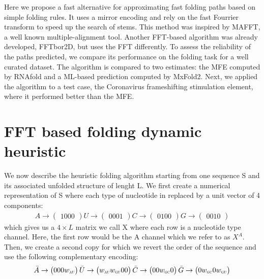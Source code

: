 \documentclass[a4paper,12pt]{article}
\begin{document}
Here we propose a fast alternative for approximating fast folding paths based on
simple folding rules. It uses a mirror encoding and rely on the fast Fourrier
transform to speed up the search of stems. This method was inspired by MAFFT, a
well known multiple-alignment tool. Another FFT-based algorithm was already
developed, FFTbor2D, but uses the FFT differently. To assess the reliability of
the paths predicted, we compare its performance on the folding task for a well
curated dataset. The algorithm is compared to two estimates: the MFE computed by
RNAfold and a ML-based prediction computed by MxFold2. Next, we applied the
algorithm to a test case, the Coronavirus frameshifting stimulation element,
where it performed better than the MFE.

\section{FFT based folding dynamic heuristic}
\label{sec:org5175ba6}
We now describe the heuristic folding algorithm starting from one sequence S and
its associated unfolded structure of lenght L. We first create a numerical
representation of S where each type of nucleotide in replaced by a unit vector
of 4 components:
\begin{equation}
\begin{split}
A \rightarrow \begin{pmatrix} 1 0 0 0 \end{pmatrix}
U \rightarrow \begin{pmatrix} 0 0 0 1 \end{pmatrix}
C \rightarrow \begin{pmatrix} 0 1 0 0 \end{pmatrix}
G \rightarrow \begin{pmatrix} 0 0 1 0 \end{pmatrix}
\end{split}
\end{equation}
which gives us a \(4 \times L\) matrix we call X where each row is a nucleotide
type channel. Here, the first row would be the A channel which we refer to as
\(X^A\). Then, we create a second copy for which we revert the order of the
sequence and use the following complementary encoding:
\begin{equation}
\begin{split}
\bar{A} \rightarrow \begin{pmatrix} 0 0 0 w_{\scalebox{0.5}{AU}} \end{pmatrix}
\bar{U} \rightarrow \begin{pmatrix} w_{\scalebox{0.5}{AU}} w_{\scalebox{0.5}{GU}} 0 0 \end{pmatrix}
\bar{C} \rightarrow \begin{pmatrix} 0 0 w_{\scalebox{0.5}{GC}} 0 \end{pmatrix}
\bar{G} \rightarrow \begin{pmatrix} 0 w_{\scalebox{0.5}{GC}} 0 w_{\scalebox{0.5}{GU}} \end{pmatrix}
\end{split}
\end{equation}
\end{document}
